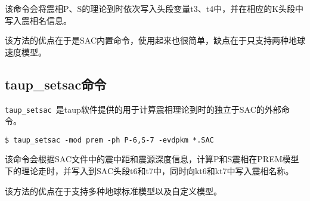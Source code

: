 该命令会将震相P、S的理论到时依次写入头段变量t3、t4中，并在相应的K头段中写入震相名信息。

该方法的优点在于是SAC内置命令，使用起来也很简单，缺点在于只支持两种地球速度模型。

\subsection{taup\_setsac命令}
\verb+taup_setsac+~是taup软件提供的用于计算震相理论到时的独立于SAC的外部命令。

\begin{verbatim}
$ taup_setsac -mod prem -ph P-6,S-7 -evdpkm *.SAC
\end{verbatim}

该命令会根据SAC文件中的震中距和震源深度信息，计算P和S震相在PREM模型下的理论走时，并写入到SAC头段t6和t7中，同时向kt6和kt7中写入震相名称。

该方法的优点在于支持多种地球标准模型以及自定义模型。
